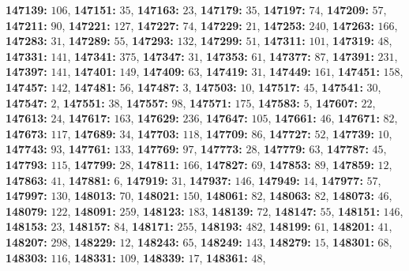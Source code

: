 \textsf{\bfseries 147139:} $106$, \textsf{\bfseries 147151:} $35$, \textsf{\bfseries 147163:} $23$, \textsf{\bfseries 147179:} $35$, \textsf{\bfseries 147197:} $74$, \textsf{\bfseries 147209:} $57$, \textsf{\bfseries 147211:} $90$, \textsf{\bfseries 147221:} $127$, \textsf{\bfseries 147227:} $74$, \textsf{\bfseries 147229:} $21$, \textsf{\bfseries 147253:} $240$, \textsf{\bfseries 147263:} $166$, \textsf{\bfseries 147283:} $31$, \textsf{\bfseries 147289:} $55$, \textsf{\bfseries 147293:} $132$, \textsf{\bfseries 147299:} $51$, \textsf{\bfseries 147311:} $101$, \textsf{\bfseries 147319:} $48$, \textsf{\bfseries 147331:} $141$, \textsf{\bfseries 147341:} $375$, \textsf{\bfseries 147347:} $31$, \textsf{\bfseries 147353:} $61$, \textsf{\bfseries 147377:} $87$, \textsf{\bfseries 147391:} $231$, \textsf{\bfseries 147397:} $141$, \textsf{\bfseries 147401:} $149$, \textsf{\bfseries 147409:} $63$, \textsf{\bfseries 147419:} $31$, \textsf{\bfseries 147449:} $161$, \textsf{\bfseries 147451:} $158$, \textsf{\bfseries 147457:} $142$, \textsf{\bfseries 147481:} $56$, \textsf{\bfseries 147487:} $3$, \textsf{\bfseries 147503:} $10$, \textsf{\bfseries 147517:} $45$, \textsf{\bfseries 147541:} $30$, \textsf{\bfseries 147547:} $2$, \textsf{\bfseries 147551:} $38$, \textsf{\bfseries 147557:} $98$, \textsf{\bfseries 147571:} $175$, \textsf{\bfseries 147583:} $5$, \textsf{\bfseries 147607:} $22$, \textsf{\bfseries 147613:} $24$, \textsf{\bfseries 147617:} $163$, \textsf{\bfseries 147629:} $236$, \textsf{\bfseries 147647:} $105$, \textsf{\bfseries 147661:} $46$, \textsf{\bfseries 147671:} $82$, \textsf{\bfseries 147673:} $117$, \textsf{\bfseries 147689:} $34$, \textsf{\bfseries 147703:} $118$, \textsf{\bfseries 147709:} $86$, \textsf{\bfseries 147727:} $52$, \textsf{\bfseries 147739:} $10$, \textsf{\bfseries 147743:} $93$, \textsf{\bfseries 147761:} $133$, \textsf{\bfseries 147769:} $97$, \textsf{\bfseries 147773:} $28$, \textsf{\bfseries 147779:} $63$, \textsf{\bfseries 147787:} $45$, \textsf{\bfseries 147793:} $115$, \textsf{\bfseries 147799:} $28$, \textsf{\bfseries 147811:} $166$, \textsf{\bfseries 147827:} $69$, \textsf{\bfseries 147853:} $89$, \textsf{\bfseries 147859:} $12$, \textsf{\bfseries 147863:} $41$, \textsf{\bfseries 147881:} $6$, \textsf{\bfseries 147919:} $31$, \textsf{\bfseries 147937:} $146$, \textsf{\bfseries 147949:} $14$, \textsf{\bfseries 147977:} $57$, \textsf{\bfseries 147997:} $130$, \textsf{\bfseries 148013:} $70$, \textsf{\bfseries 148021:} $150$, \textsf{\bfseries 148061:} $82$, \textsf{\bfseries 148063:} $82$, \textsf{\bfseries 148073:} $46$, \textsf{\bfseries 148079:} $122$, \textsf{\bfseries 148091:} $259$, \textsf{\bfseries 148123:} $183$, \textsf{\bfseries 148139:} $72$, \textsf{\bfseries 148147:} $55$, \textsf{\bfseries 148151:} $146$, \textsf{\bfseries 148153:} $23$, \textsf{\bfseries 148157:} $84$, \textsf{\bfseries 148171:} $255$, \textsf{\bfseries 148193:} $482$, \textsf{\bfseries 148199:} $61$, \textsf{\bfseries 148201:} $41$, \textsf{\bfseries 148207:} $298$, \textsf{\bfseries 148229:} $12$, \textsf{\bfseries 148243:} $65$, \textsf{\bfseries 148249:} $143$, \textsf{\bfseries 148279:} $15$, \textsf{\bfseries 148301:} $68$, \textsf{\bfseries 148303:} $116$, \textsf{\bfseries 148331:} $109$, \textsf{\bfseries 148339:} $17$, \textsf{\bfseries 148361:} $48$, 
